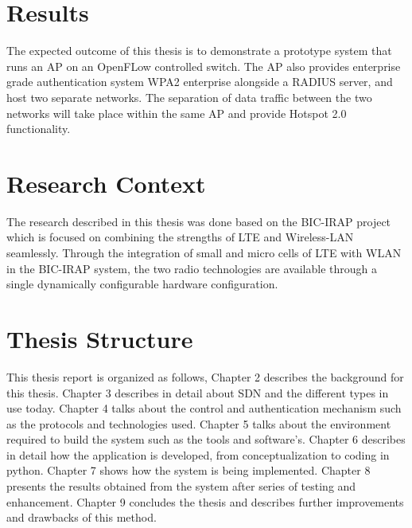 \section{Results}\label{sec:Results}
The expected outcome of this thesis is to demonstrate a prototype system that runs an AP on an OpenFLow controlled switch. The AP also provides enterprise grade authentication system WPA2 enterprise alongside a RADIUS server, and host two separate networks. The separation of data traffic between the two networks will take place within the same AP and provide Hotspot 2.0 functionality.

\section{Research Context\cite{BIC:IRAP}}\label{sec:BIC-IRAP}
The research described in this thesis was done based on the BIC-IRAP project which is focused on combining the strengths of LTE and Wireless-LAN seamlessly. Through the integration of small and micro cells of LTE with WLAN in the BIC-IRAP system, the two radio technologies are available through a single dynamically configurable hardware configuration.

\section{Thesis Structure}\label{sec:Structure}
This thesis report is organized as follows, Chapter 2 describes the background for this thesis. Chapter 3 describes in detail about SDN and the different types in use today. Chapter 4 talks about the control and authentication mechanism such as the protocols and technologies used. Chapter 5 talks about the environment required to build the system such as the tools and software’s. Chapter 6 describes in detail how the application is developed, from conceptualization to coding in python. Chapter 7 shows how the system is being implemented. Chapter 8 presents the results obtained from the system after series of testing and enhancement. Chapter 9 concludes the thesis and describes further improvements and drawbacks of this method.



